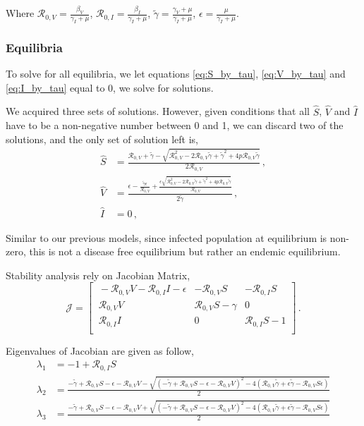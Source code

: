 \documentclass[12pt]{article}
\newcommand{\R}{\mathcal{R}}
\begin{document}
Where $\R_{0,V}=\frac{\beta_V}{\gamma_I+\mu}$, $\R_{0,I}=\frac{\beta_I}{\gamma_I+\mu}$, $\tilde{\gamma}=\frac{\gamma_V+\mu}{\gamma_I+\mu}$, $\epsilon=\frac{\mu}{\gamma_I+\mu}$.

\subsubsection{Equilibria}

To solve for all equilibria, we let equations \autoref{eq:S_by_tau}, \autoref{eq:V_by_tau} and \autoref{eq:I_by_tau} equal to 0, we solve for solutions.

We acquired three sets of solutions. However, given conditions that all $\hat{S}$, $\hat{V}$ and $\hat{I}$ have to be a non-negative number between 0 and 1, we can discard two of the solutions, and the only set of solution left is, 
\begin{subequations}
\begin{align}
\hat{S}&= \frac{\R_{0,V}+\tilde{\gamma}-\sqrt{\R_{0,V}^2-2\R_{0,V}\tilde{\gamma}+\tilde{\gamma}^2+4p\R_{0,V}\tilde{\gamma}}}{2\R_{0,V}}\,, \label{eq:Shat}\\
\hat{V}&= \frac{\epsilon-\frac{\tilde{\gamma}\epsilon}{\R_{0,V}}+\frac{\epsilon\sqrt{\R_{0,V}^2-2\R_{0,V}\tilde{\gamma}+\tilde{\gamma}^2+4p\R_{0,V}\tilde{\gamma}}}{\R_{0,V}}}{2\tilde{\gamma}}\,, \label{eq:Vhat}\\
\hat{I}&=0\,, \label{eq:Ihat}
\end{align}
\end{subequations}

Similar to our previous models, since infected population at equilibrium is non-zero, this is not a disease free equilibrium but rather an endemic equilibrium.

Stability analysis rely on Jacobian Matrix,
\begin{equation}
\mathcal{J} =
\begin{bmatrix}
    \ -\R_{0,V}V-\R_{0,I}I-\epsilon       & -\R_{0,V}S     &-\R_{0,I}S\\
    \ \R_{0,V}V       & \R_{0,V}S-\gamma    &0\\
    \ \R_{0,I}I       &0     &\R_{0,I} S-1\\
\end{bmatrix}\,.
\end{equation}

Eigenvalues of Jacobian are given as follow,
\begin{subequations}
\begin{align}
\lambda_1&=-1+\R_{0,I} S \label{eq:lambda1}\\
\lambda_2&=\frac{-\tilde{\gamma}+\R_{0,V}S-\epsilon-\R_{0,V}V-\sqrt{(-\tilde{\gamma}+\R_{0,V} S-\epsilon-\R_{0,V}V)^2-4(\R_{0,V}\tilde{\gamma}+\epsilon\tilde{\gamma}-\R_{0,V}S\epsilon)}}{2} \label{eq:lambda2}\\
\lambda_3&=\frac{-\tilde{\gamma}+\R_{0,V}S-\epsilon-\R_{0,V}V+\sqrt{(-\tilde{\gamma}+\R_{0,V} S-\epsilon-\R_{0,V}V)^2-4(\R_{0,V}\tilde{\gamma}+\epsilon\tilde{\gamma}-\R_{0,V}S\epsilon)}}{2}\label{eq:lambda3}
\end{align}
\end{subequations}
\end{document}
